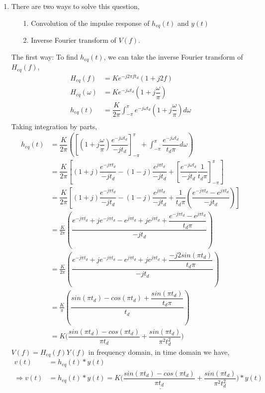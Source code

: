 \documentclass[11pt]{article}
\begin{document}
\begin{enumerate}[label=(\alph*)]
\item There are two ways to solve this question,
\begin{enumerate}
\item[1.] Convolution of the impulse response of $h_{eq}(t)$ and $y(t)$
\item[2.] Inverse Fourier transform of $V(f)$.
\end{enumerate}
The first way: To find $h_{eq}(t)$, we can take the inverse Fourier transform of $H_{eq}(f)$,
\begin{align*}
    H_{eq}(f)&=  Ke^{-j2 \pi f t_d}(1+j2f)\\
    H_{eq}(\omega)&=Ke^{-j\omega t_d}(1+j\dfrac{\omega}{\pi})\\
    h_{eq}(t)&=\dfrac{K}{2\pi} \int_{-\pi}^{\pi} e^{-j\omega t_d} (1+j\dfrac{\omega}{\pi})d\omega \\
\end{align*}
Taking integration by parts,
\begin{align*}
    h_{eq}(t)&=\dfrac{K}{2\pi} ([(1+j\dfrac{\omega}{\pi})\dfrac{e^{-j\omega t_d}}{-jt_d}]_{-\pi}^{\pi}  +\int_{-\pi}^{\pi}\dfrac{ e^{-j\omega t_d}}{t_d\pi} d\omega)\\
    &=\dfrac{K}{2\pi} [(1+j)\dfrac{ e^{-j\pi t_d}}{-jt_d}-(1-j)\dfrac{ e^{j\pi t_d}}{-jt_d}+[\dfrac{e^{-j\omega t_d}}{-jt_d}\dfrac{1}{t_d\pi}]_{-\pi}^{\pi}]\\
    &=\dfrac{K}{2\pi} [(1+j)\dfrac{ e^{-j\pi t_d}}{-jt_d}-(1-j)\dfrac{ e^{j\pi t_d}}{-jt_d}+\dfrac{1}{t_d \pi}(\dfrac{e^{-j\pi t_d}-e^{j\pi t_d}}{-j t_d})]\\
    &= \frac{K}{2\pi}(\dfrac{e^{-j\pi t_d}+je^{-j\pi t_d}-e^{j\pi t_d}+je^{j\pi t_d}+\dfrac{e^{-j\pi t_d}-e^{j\pi t_d}}{t_d \pi}}{-j t_d}) \\
    &= \frac{K}{2\pi}(\dfrac{e^{-j\pi t_d}+je^{-j\pi t_d}-e^{j\pi t_d}+je^{j\pi t_d}+\dfrac{-j2sin(\pi t_d)}{t_d \pi}}{-j t_d}) \\
    &=\frac{K}{\pi}(\dfrac{sin(\pi t_d)-cos(\pi t_d)+\dfrac{sin(\pi t_d)}{t_d \pi}}{t_d}) \\
    &=K\Big (\dfrac{sin(\pi t_d)-cos(\pi t_d)}{\pi t_d}+\dfrac{sin(\pi t_d)}{\pi ^2  t_d^2}\Big)
\end{align*}    
$V(f)=H_{eq}(f)Y(f)$ in frequency domain, in time domain we have,
\begin{align*}
    v(t)&=h_{eq}(t)*y(t)\\
    \Rightarrow v(t)&=\underline{h_{eq}(t)*y(t)=K\Big (\dfrac{sin(\pi t_d)-cos(\pi t_d)}{\pi t_d}+\dfrac{sin(\pi t_d)}{\pi ^2  t_d^2}\Big) * y(t)}
\end{align*}

\end{enumerate}
\end{document}
